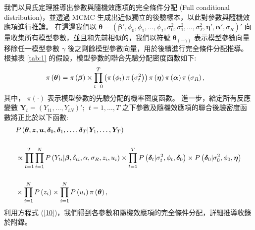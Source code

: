 \documentclass[12pt,a4paper]{article}
\begin{document}
\begin{CJK}{UTF8}{bkai}
\noindent
我們以貝氏定理推導出參數與隨機效應項的完全條件分配 (Full conditional distribution)，並透過 MCMC 生成出近似獨立的後驗樣本，以此對參數與隨機效應項進行推論。
在這邊我們以 $\bm{\theta}=(\bm{\beta}',\phi_0,\phi_1,\dots,\phi_T,\sigma_0^2,\sigma_1^2,\dots,\sigma_T^2,\bm{\eta}',\bm{\alpha}',\sigma_R)'$ 向量收集所有模型參數，並且和先前相似的，我們以符號 $\bm{\theta}_{(-\gamma)}$ 表示模型參數向量移除任一模型參數 $\gamma$ 後之剩餘模型參數向量，用於後續進行完全條件分配推導。
根據表 \ref{tab:1} 的假設，模型參數的聯合先驗分配密度函數如下:
 \begin{equation*}
 \setlength\abovedisplayskip{25pt}
 \setlength\belowdisplayskip{25pt}
 \begin{split}
 \pi\left(\bm{\theta}\right) & =\pi\left(\bm{\beta}\right) \times\prod_{t=0}^T \left(\pi\left(\phi_t\right)\pi\left(\sigma_t^2\right)\right) \pi\left(\bm{\eta}\right)\pi\left(\bm{\alpha}\right)\pi\left(\sigma_R\right),
 \end{split}
 \end{equation*}
其中， $\pi\left(\cdot\right)$ 表示模型參數的先驗分配的機率密度函數。
進一步，給定所有反應變數 $\bm{Y}_t=(Y_{t1},\ldots,Y_{tN})';\:\:t=1,\ldots,T$ 之下參數及隨機效應項的聯合後驗密度函數將正比於以下函數:
 \begin{equation}
 \setlength\abovedisplayskip{25pt}
 \setlength\belowdisplayskip{25pt}
 \begin{split}
 &P\left(\bm{\theta},\bm{z},\bm{u},\bm{\delta}_0,\bm{\delta}_1,\dots,\bm{\delta}_T|\bm{Y}_1,\dots,\bm{Y}_T\right) \\[5mm]
 & \propto
 \prod_{t=1}^T \prod_{i=1}^NP\left(Y_{ti}|\bm{\beta},\delta_{ti},\alpha,\sigma_R,z_i,u_i\right) \times \prod_{t=1}^TP\left(\bm{\delta}_t|\sigma_t^2,\phi_t,\bm{\delta}_0\right) \times P\left(\bm{\delta}_0|\sigma_0^2,\phi_0,\bm{\eta}\right) \\[5mm]
 & \times \prod_{i=1}^NP\left(z_i\right) \times \prod_{i=1}^NP\left(u_i\right)\pi\left(\bm{\theta}\right),
 \end{split}
 \label{10}
 \end{equation}
\noindent
利用方程式 (\ref{10})，我們得到各參數和隨機效應項的完全條件分配，詳細推導收錄於附錄。


\end{CJK}
\end{document}
